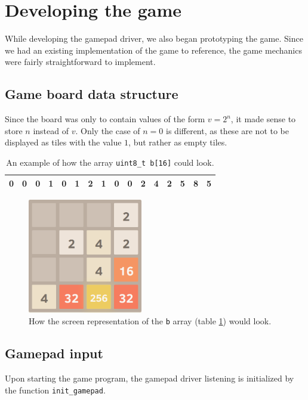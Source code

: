 \newpage
\section{Developing the game}
While developing the gamepad driver, we also began prototyping the game.
Since we had an existing implementation of the game \cite{2048} to reference,
the game mechanics were fairly straightforward to implement.

\subsection{Game board data structure}
Since the board was only to contain values of the form $v = 2^n$, it made sense to store $n$ instead of $v$. Only the case of $n = 0$ is different, as these are not to be displayed as tiles with the value $1$, but rather as empty tiles.

\begin{table}[h!]
    \centering
    \begin{tabular}{|l|l|l|l|l|l|l|l|l|l|l|l|l|l|l|l|}
        \hline
        0 & 0 & 0 & 1 & 0 & 1 & 2 & 1 & 0 & 0 & 2 & 4 & 2 & 5 & 8 & 5 \\ \hline
    \end{tabular}
    \caption{An example of how the array \texttt{uint8\_t b[16]} could look.}
    \label{array_b}
\end{table}

\begin{figure}[h!]
    \centering
    \includegraphics[width=5cm]{img/2048.png}
    \caption{How the screen representation of the \texttt{b} array (table \ref{array_b}) would look.}
\end{figure}

\newpage
\subsection{Gamepad input}
Upon starting the game program, the gamepad driver listening is initialized by the function \texttt{init\_gamepad}.

